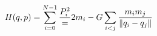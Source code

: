 \documentclass[preview]{standalone}
\begin{document}
\begin{align*}
\special{dvisvgm:raw <g id='unique000'>}H(q,p) = \sum_{i=0}^{N-1}\frac{P^2_i}={2m_i} - G \sum_{i<j} \frac{m_i m_j}{\norm{q_i - q_j}}\special{dvisvgm:raw </g>}
\end{align*}
\end{document}
